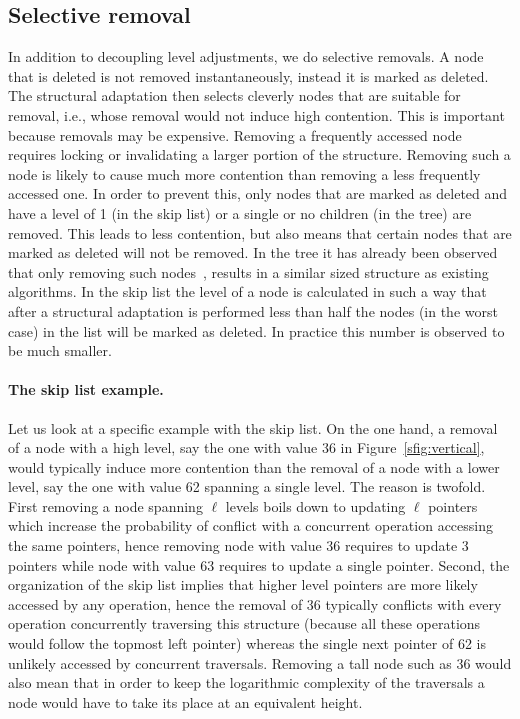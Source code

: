 \subsection{Selective removal}
In addition to decoupling level adjustments, we do selective removals.
A node that is deleted is not removed instantaneously, instead it is
marked as deleted.  The structural adaptation then selects cleverly nodes that
are suitable for removal, i.e., whose removal would not induce high contention.
This is
important because removals may be expensive.  
Removing a frequently accessed node
requires locking or invalidating a larger
portion of the structure.
Removing such a node is likely to cause much more contention
than removing a less frequently accessed one.
In order to prevent this, only nodes
that are marked as deleted and have a level of 1 (in the skip list) or 
a single or no children (in the tree) are removed.
This leads to less contention, but also means that certain nodes that are marked as deleted will not be removed.
In the tree it has already been observed that only removing such nodes~\cite{CGR12},\cite{BCCO10} results in a similar sized structure
as existing algorithms.
In the skip list the level of a node is calculated in such a way that after a structural adaptation is performed less than
half the nodes (in the worst case) in the list will be marked as deleted.
In practice this number is observed to be much smaller.

\paragraph{The skip list example.}
Let us look at a specific example with the skip list.
On the one hand, a removal of a node with a high level, say the one with value 36 in 
Figure~\ref{sfig:vertical}, would typically induce more contention than the removal of a node with a lower 
level, say the one with value 62 spanning a single level.
The reason is twofold. First removing a node spanning $\ell$ levels boils down to updating $\ell$ 
pointers which increase the probability of conflict with a concurrent operation accessing the same 
pointers, hence removing node with value 36 requires to update 3 pointers while node with value 63 
requires to update a single pointer. Second, the organization of the skip list implies that higher level 
pointers are more likely accessed by any operation, hence the removal of 36 
typically conflicts with every operation concurrently traversing this structure (because all these 
operations would follow the topmost left pointer) whereas the single next pointer of 62 is unlikely accessed by concurrent traversals.
Removing a tall node such as 36 would also mean that in order to keep the logarithmic complexity of the traversals a
node would have to take its place at an equivalent height.

